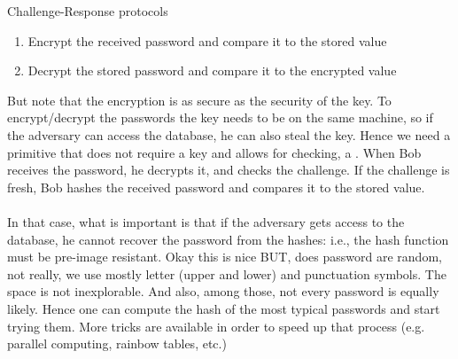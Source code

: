 \begin{parag}{Challenge-Response protocols}
	\begin{enumerate}
	    \item Encrypt the received password and compare it to the stored value
	    \item Decrypt the stored password and compare it to the encrypted value
	\end{enumerate}
	But note that the encryption is as secure as the security of the key. To encrypt/decrypt the passwords the key needs to be on the same machine, so if the adversary can access the database, he can also steal the key. Hence we need a primitive that does not require a key and allows for checking, a . When Bob receives the password, he decrypts it, and checks the challenge. If the challenge is fresh, Bob hashes the received password and compares it to the stored value.\\
	$ $\\
	In that case, what is important is that if the adversary gets access to the database, he cannot recover the password from the hashes: i.e., the hash function must be pre-image resistant. Okay this is nice BUT, does password are random, not really, we use mostly letter (upper and lower) and punctuation symbols. The space is not inexplorable. And also, among those, not every password is equally likely. Hence one can compute the hash of the most typical passwords and start trying them. More tricks are available in order to speed up that process (e.g. parallel computing, rainbow tables, etc.)
	
\end{parag}

